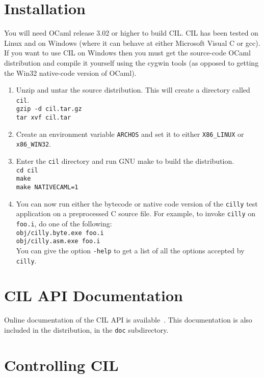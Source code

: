 \documentclass{article}
\newcommand{\hsp}{\hspace{0.5in}}
\newcommand{\t}[1]{{\tt #1}}
\begin{document}
\section{Installation}

You will need OCaml release 3.02 or higher to build CIL. CIL has been tested
on Linux and on Windows (where it can behave at either Microsoft Visual C or
gcc). If you want to use CIL on Windows then you must get the source-code
OCaml distribution and compile it yourself using the cygwin tools (as opposed
to getting the Win32 native-code version of OCaml).

\begin{enumerate}
\item Unzip and untar the source distribution. This will create a directory
      called \t{cil}. \\
      \hsp\verb!gzip -d cil.tar.gz!\\
      \hsp\verb!tar xvf cil.tar!
\item Create an environment variable \t{ARCHOS} and set it to either
      \t{X86\_LINUX} or \t{x86\_WIN32}.
\item Enter the \t{cil} directory and run GNU make to build the 
      distribution.\\
      \hsp\verb!cd cil!\\
      \hsp\verb!make!\\
      \hsp\verb!make NATIVECAML=1!\\

\item You can now run either the bytecode or native code version of the
      \t{cilly} test application on a preprocessed C source file. For example,
      to invoke \t{cilly} on \t{foo.i}, do one of the following:\\
      \hsp\verb!obj/cilly.byte.exe foo.i!\\
      \hsp\verb!obj/cilly.asm.exe foo.i!\\
      You can give the option \verb!-help! to get a list of all
      the options accepted by \t{cilly}.
\end{enumerate}

\section{CIL API Documentation} 
Online documentation of the CIL API is available~. This
documentation is also included in the distribution, in the \t{doc}
subdirectory. 

\section{Controlling CIL}
\end{document}
